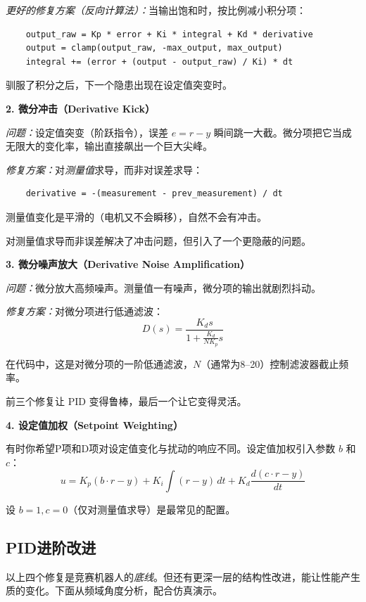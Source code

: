 \textit{更好的修复方案（反向计算法）：}当输出饱和时，按比例减小积分项：
\begin{verbatim}
    output_raw = Kp * error + Ki * integral + Kd * derivative
    output = clamp(output_raw, -max_output, max_output)
    integral += (error + (output - output_raw) / Ki) * dt
\end{verbatim}

驯服了积分之后，下一个隐患出现在设定值突变时。

\textbf{2. 微分冲击（Derivative Kick）}

\textit{问题：}设定值突变（阶跃指令），误差 $e = r - y$ 瞬间跳一大截。微分项把它当成无限大的变化率，输出直接飙出一个巨大尖峰。

\textit{修复方案：}对\textit{测量值}求导，而非对误差求导：
\begin{verbatim}
    derivative = -(measurement - prev_measurement) / dt
\end{verbatim}

测量值变化是平滑的（电机又不会瞬移），自然不会有冲击。

对测量值求导而非误差解决了冲击问题，但引入了一个更隐蔽的问题。

\textbf{3. 微分噪声放大（Derivative Noise Amplification）}

\textit{问题：}微分放大高频噪声。测量值一有噪声，微分项的输出就剧烈抖动。

\textit{修复方案：}对微分项进行低通滤波：
\begin{equation}
D(s) = \frac{K_d s}{1 + \frac{K_d}{N K_p} s}
\end{equation}

在代码中，这是对微分项的一阶低通滤波，$N$（通常为8--20）控制滤波器截止频率。

前三个修复让 PID 变得鲁棒，最后一个让它变得灵活。

\textbf{4. 设定值加权（Setpoint Weighting）}

有时你希望P项和D项对设定值变化与扰动的响应不同。设定值加权引入参数 $b$ 和 $c$：
\begin{equation}
u = K_p(b \cdot r - y) + K_i \int (r - y) \, dt + K_d \frac{d(c \cdot r - y)}{dt}
\end{equation}

设 $b = 1, c = 0$（仅对测量值求导）是最常见的配置。

\subsection{PID进阶改进}

以上四个修复是竞赛机器人的\textit{底线}。但还有更深一层的结构性改进，能让性能产生质的变化。下面从频域角度分析，配合仿真演示。

